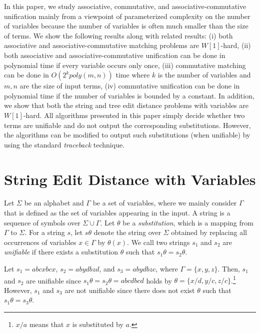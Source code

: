 \documentclass[a4paper]{llncs}
\begin{document}
In this paper, we study associative, commutative, and associative-commutative
unification mainly from a viewpoint of parameterized complexity on
the number of variables because
the number of variables is often much smaller than the size of terms.
We show the following results along with related results:
(i) both associative and
associative-commutative matching problems are $W[1]$-hard,
(ii) both associative and associative-commutative unification 
can be done in polynomial time if every variable occurs only once,
(iii) commutative matching can be done in $O(2^{k} poly(m,n))$ time
where $k$ is the number of variables and $m,n$ are the size of
input terms,
(iv) commutative unification can be done in polynomial time
if the number of variables is bounded by a constant.
In addition, we show that 
both the string and tree edit distance problems with variables 
are $W[1]$-hard.
All algorithms presented in this paper simply decide whether two terms
are unifiable and do not output the corresponding substitutions.
However, the algorithms can be modified to output such substitutions
(when unifiable)
by using the standard \emph{traceback} technique.

\section{String Edit Distance with Variables}

Let $\Sigma$ be an alphabet and $\Gamma$ be a set of variables,
where we mainly consider $\Gamma$ that is defined as
the set of variables appearing in the input.
A string is a sequence of symbols over $\Sigma \cup \Gamma$.
Let $\theta$ be a \emph{substitution},
which is a mapping from $\Gamma$ to $\Sigma$.
For a string $s$, let $s \theta$ denote the string over $\Sigma$
obtained by replacing all occurrences of variables $x \in \Gamma$
by $\theta(x)$.
We call two strings $s_1$ and $s_2$ are \emph{unifiable}
if there exists a substitution $\theta$ such that
$s_1 \theta = s_2 \theta$.

\begin{example}
Let $s_1 = abcxbcx$, $s_2 = abydbzd$, and $s_3 = abydbzc$,
where $\Gamma=\{x,y,z\}$.
Then, $s_1$ and $s_2$ are unifiable since
$s_1 \theta = s_2 \theta = abcdbcd$ holds
by $\theta=\{x/d,y/c,z/c\}$.\footnote{$x/a$ means that $x$ is substituted by
$a$.}
However, $s_1$ and $s_3$ are not unifiable since there does not exist
$\theta$ such that $s_1 \theta = s_3 \theta$.
\end{example}
\end{document}

